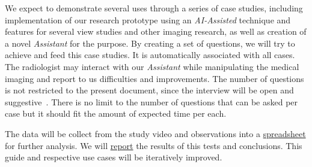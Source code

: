 \hfill


We expect to demonstrate several uses through a series of case studies, including implementation of our research prototype using an \textit{AI-Assisted} technique and features for several view studies and other imaging research, as well as creation of a novel \textit{Assistant} for the purpose. By creating a set of questions, we will try to achieve and feed this case studies. It is automatically associated with all cases. The radiologist may interact with our \textit{Assistant} while manipulating the medical imaging and report to us difficulties and improvements. The number of questions is not restricted to the present document, since the interview will be open and suggestive~\cite{joyce2017healthcare}. There is no limit to the number of questions that can be asked per case but it should fit the amount of expected time per each.

The data will be collect from the study video and observations into a \hyperlink{https://docs.google.com/spreadsheets/d/1CoPLONnINdBWryGs7SBRuPZA-DnQ0t_yzx3u8ym0UoI/edit?usp=sharing}{spreadsheet} for further analysis. We will \hyperlink{https://github.com/mida-project/research-reports}{report} the results of this tests and conclusions. This guide and respective use cases will be iteratively improved.


